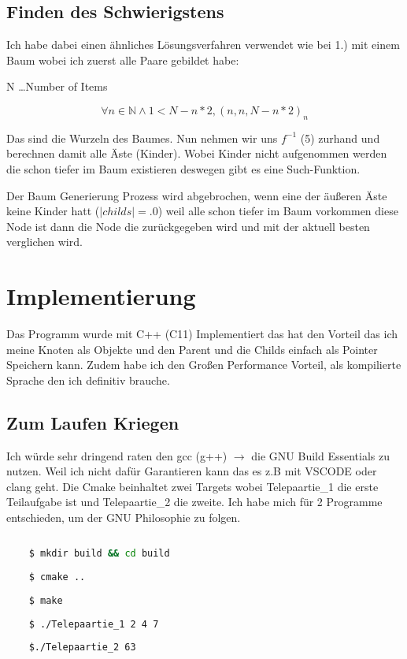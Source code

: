 \documentclass{article}
\begin{document}
\subsection*{ Finden des Schwierigstens}

Ich habe dabei einen ähnliches Lösungsverfahren verwendet wie bei 1.) mit einem Baum wobei ich zuerst alle Paare gebildet habe:

N \dots Number of Items

\begin{equation}
	\forall n \in \mathbb{N}  \wedge 1 < N - n * 2, (n , n , N - n * 2)_n
\end{equation}

Das sind die Wurzeln des Baumes. Nun nehmen wir uns \(f^{-1}\) (5) zurhand und berechnen damit alle Äste (Kinder). Wobei Kinder nicht aufgenommen werden die schon tiefer im Baum existieren deswegen gibt es eine Such-Funktion.

Der Baum Generierung Prozess wird abgebrochen, wenn eine der äußeren Äste keine Kinder hatt (\(|childs| =. 0 \)) weil alle schon tiefer im Baum vorkommen diese Node ist dann die Node die zurückgegeben wird und mit der aktuell besten verglichen wird.

\section{ Implementierung }
Das Programm wurde mit C++ (C11) Implementiert das hat den Vorteil das ich meine Knoten als Objekte und den Parent und die Childs einfach als Pointer Speichern kann. Zudem habe ich den Großen Performance Vorteil, als kompilierte Sprache den ich definitiv brauche.

\subsection*{ Zum Laufen Kriegen }

Ich würde sehr dringend raten den gcc (g++) \(\rightarrow\) die GNU Build Essentials zu nutzen. Weil ich nicht dafür Garantieren kann das es z.B mit VSCODE oder clang geht. Die Cmake beinhaltet zwei Targets wobei Telepaartie\_1 die erste Teilaufgabe ist und Telepaartie\_2 die zweite. Ich habe mich für 2 Programme entschieden, um der GNU Philosophie zu folgen.

\begin{lstlisting}[language=Bash]
	
	$ mkdir build && cd build
	
	$ cmake ..
	
	$ make
	
	$ ./Telepaartie_1 2 4 7
	
	$./Telepaartie_2 63

\end{lstlisting}
\end{document}
